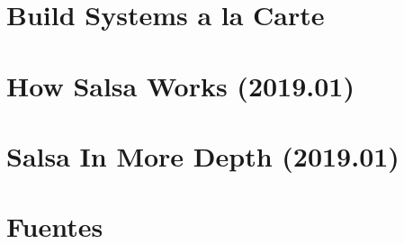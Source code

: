 \documentclass[12pt, a4paper]{report}
\begin{document}
\section*{Build Systems a la Carte}
\cite{mokhov2018build}

\section*{How Salsa Works (2019.01)}
\cite{niko2019salsaworks}

\section*{Salsa In More Depth (2019.01)}
\cite{niko2019salsadepth}

\section*{Fuentes}
\end{document}
